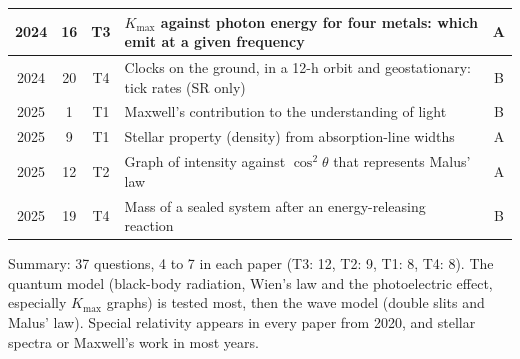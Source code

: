 \documentclass[12pt]{article}
\begin{document}
{\begin{longtable}{|c|c|c|p{108mm}|c|}
    2024 & 16 & T3 & $K_\mathrm{max}$ against photon energy for four metals: which emit at a given frequency & A\\ \hline
    2024 & 20 & T4 & Clocks on the ground, in a 12-h orbit and geostationary: tick rates (SR only) & B\\ \hline
    2025 & 1 & T1 & Maxwell's contribution to the understanding of light & B\\ \hline
    2025 & 9 & T1 & Stellar property (density) from absorption-line widths & A\\ \hline
    2025 & 12 & T2 & Graph of intensity against $\cos^2\theta$ that represents Malus' law & A\\ \hline
    2025 & 19 & T4 & Mass of a sealed system after an energy-releasing reaction & B\\ \hline
\end{longtable}}

Summary: 37 questions, 4 to 7 in each paper (T3: 12, T2: 9, T1: 8, T4: 8).
The quantum model (black-body radiation, Wien's law and the photoelectric effect, especially $K_\mathrm{max}$ graphs) is tested most, then the wave model (double slits and Malus' law). Special relativity appears in every paper from 2020, and stellar spectra or Maxwell's work in most years.
\end{document}
